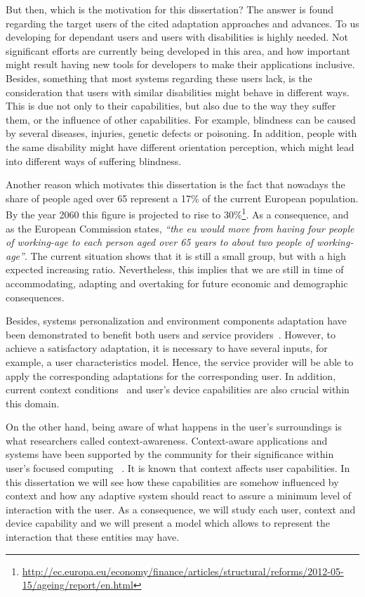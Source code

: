 But then, which is the motivation for this dissertation? The answer is found
regarding the target users of the cited adaptation approaches and advances.
To us developing for dependant users and users with disabilities is highly 
needed. Not significant efforts are currently being developed in this area, and 
how important might result having new tools for developers to make their 
applications inclusive. Besides, something that most systems regarding these 
users lack, is the consideration that users with similar disabilities might 
behave in different ways. This is due not only to their capabilities, but also 
due to the way they suffer them, or the influence of other capabilities. For 
example, blindness can be caused by several diseases, injuries, genetic defects 
or poisoning. In addition, people with the same disability might have different 
orientation perception, which might lead into different ways of suffering 
blindness.

Another reason which motivates this dissertation is the fact that nowadays the
share of people aged over 65 represent a 17\% of the current European population. By
the year 2060 this figure is projected to rise to 30\%\footnote{\url{http://ec.europa.eu/economy/finance/articles/structural/reforms/2012-05-15/ageing/report/en.html}}.
As a consequence, and as the European Commission states, \textit{``the \ac{eu} 
would move from having four people of working-age to each person aged over 65 
years to about two people of working-age''}.
The current situation shows that it is still a small group, but with a high 
expected increasing ratio. Nevertheless, this implies that we are still in time 
of accommodating, adapting and overtaking for future economic and demographic 
consequences.

Besides, systems personalization and environment components adaptation have been
demonstrated to benefit both users and service providers~\citep{kobsa_generic_2001}.
However, to achieve a satisfactory adaptation, it is necessary to have several
inputs, for example, a user characteristics model. Hence, the service provider
will be able to apply the corresponding adaptations for the corresponding user.
In addition, current context conditions~\citep{jameson_modelling_2001} and user's
device capabilities are also crucial within this domain. 

On the other hand, being aware of what happens in the user's surroundings is what
researchers called context-awareness. Context-aware applications and systems have
been supported by the community for their significance within user's focused
computing~\citep{schilit_context_aware_1994} \citep{chen_survey_2000}. It is
known that context affects user capabilities. In this dissertation we will see
how these capabilities are somehow influenced by context and how any adaptive
system should react to assure a minimum level of interaction with the user. As a
consequence, we will study each user, context and device capability and we will
present a model which allows to represent the interaction that these entities
may have. 


